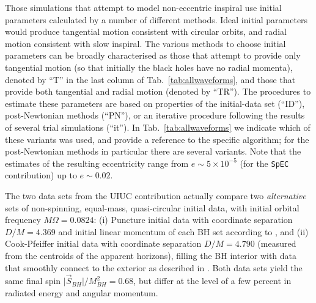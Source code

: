 Those simulations that attempt to model non-eccentric inspiral use
initial parameters calculated by a number of different methods. Ideal
initial parameters would produce tangential motion consistent with
circular orbits, and radial motion consistent with slow inspiral. The
various methods to choose initial parameters can be broadly
characterised as those that attempt to provide only tangential motion
(so that initially the black holes have no radial momenta), denoted by
``T'' in the last column of Tab.~\ref{tab:allwaveforms}, and those
that provide both tangential and radial motion (denoted by ``TR'').
The procedures to estimate these parameters are based on properties of
the initial-data set (``ID''), post-Newtonian methods (``PN''), or an
iterative procedure following the results of several trial simulations
(``it''). In Tab.~\ref{tab:allwaveforms} we indicate which of these
variants was used, and provide a reference to the specific algorithm;
for the post-Newtonian methods in particular there are several
variants.  Note that the estimates of the resulting eccentricity range
from $e\sim 5\times 10^{-5}$ (for the {\tt SpEC} contribution) up to
$e \sim 0.02$. 

The two data sets from the UIUC contribution actually compare two {\em
alternative} sets of non-spinning, equal-mass, quasi-circular initial
data, with initial orbital frequency $M\Omega=0.0824$: (i) Puncture
initial data with coordinate separation $D/M=4.369$ and initial linear
momentum of each BH set according to \cite{Tichy:2003qi}, and (ii)
Cook-Pfeiffer initial data with coordinate separation $D/M=4.790$
\cite{Pfeiffer_data,Cook:2004kt} (measured from the centroids of the
apparent horizons), filling the BH interior with data that smoothly
connect to the exterior as described in \cite{Etienne:2007hr}.  Both
data sets yield the same final spin $\vert\vec S_{BH}\vert/M_{BH}^2 =
0.68$, but differ at the level of a few percent in radiated energy and
angular momentum. 

